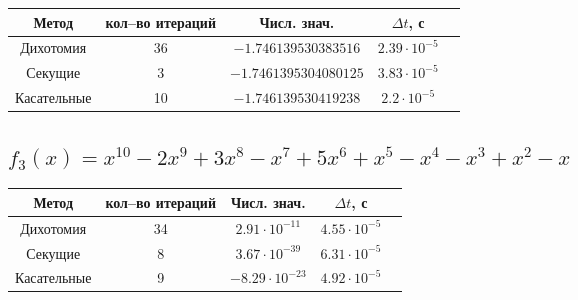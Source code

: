 \documentclass[a4paper,12pt]{extarticle}
\begin{document}
    \begin{center}
        \begin{tabular}{ |c|c|c|c|c| }
            \hline
            Метод       & кол--во итераций & Числ. знач.           & $\Delta t$, с       \\
            \hline
            Дихотомия   & 36               & $-1.746139530383516$  & $2.39\cdot 10^{-5}$ \\
            \hline
            Секущие     & 3                & $-1.7461395304080125$ & $3.83\cdot 10^{-5}$ \\
            \hline
            Касательные & 10               & $-1.746139530419238$  & $2.2\cdot 10^{-5}$  \\
            \hline
        \end{tabular}
    \end{center}

    \subsection{$f_3(x) = x^{10} - 2x^9 + 3x^8 - x^7 + 5x^6 + x^5 - x^4 - x^3 + x^2 - x$}

    \begin{center}
        \begin{tabular}{ |c|c|c|c|c| }
            \hline
            Метод     & кол--во итераций & Числ. знач.                        & $\Delta t$, с       \\
            \hline
            Дихотомия & 34               & $2.91\cdot 10^{-11}$ & $4.55\cdot 10^{-5}$ \\
            \hline
            Секущие & 8                & $3.67\cdot 10^{-39}$ & $6.31\cdot 10^{-5}$ \\
            \hline
            Касательные & 9                & $-8.29\cdot 10^{-23}$ & $4.92\cdot 10^{-5}$ \\
            \hline
        \end{tabular}
    \end{center}

    \centering{\LaTeX}
\end{document}

